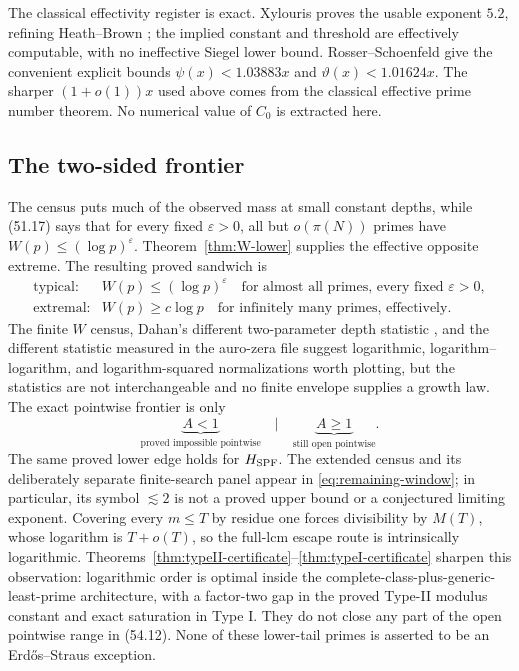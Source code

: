 \documentclass[10pt,reqno]{amsart}
\theoremstyle{definition}
\newcommand{\1}{\mathbf 1}
\newcommand{\eps}{\varepsilon}
\begin{document}
The classical effectivity register is exact.  Xylouris
\cite{Xylouris} proves the usable exponent $5.2$, refining Heath--Brown
\cite{HeathBrown}; the implied constant and threshold are effectively
computable, with no ineffective Siegel lower bound.  Rosser--Schoenfeld
\cite{RosserSchoenfeld} give the convenient explicit bounds
$\psi(x)<1.03883x$ and $\vartheta(x)<1.01624x$.  The sharper
$(1+o(1))x$ used above comes from the classical effective prime number
theorem.  No numerical value of $C_0$ is extracted here.

\subsection{The two-sided frontier}
The census puts much of the observed mass at small constant depths, while
(51.17) says that for every fixed $\eps>0$, all but $o(\pi(N))$ primes have
$W(p)\leq(\log p)^\eps$.  Theorem~\ref{thm:W-lower} supplies the effective
opposite extreme.  The resulting proved sandwich is
\begin{equation}\tag{54.11}
 \begin{array}{cl}
 \text{typical:}&W(p)\leq(\log p)^\eps
      \quad\text{for almost all primes, every fixed }\eps>0,\\
 \text{extremal:}&W(p)\geq c\log p
      \quad\text{for infinitely many primes, effectively}.
 \end{array}
\end{equation}
The finite $W$ census, Dahan's different two-parameter depth statistic
\cite{Dahan}, and the different statistic measured in the auro-zera file
suggest logarithmic, logarithm--logarithm, and logarithm-squared
normalizations worth plotting, but the statistics are not interchangeable
and no finite envelope supplies a growth law.  The exact pointwise frontier
is only
\begin{equation}\tag{54.12}
 \boxed{\quad
 \underbrace{A<1}_{\text{proved impossible pointwise}}
 \quad\big|\quad
 \underbrace{A\geq1}_{\text{still open pointwise}}.
 \quad}
\end{equation}
The same proved lower edge holds for $H_{\rm SPF}$.  The extended census and
its deliberately separate finite-search panel appear in
\eqref{eq:remaining-window}; in particular, its symbol $\lesssim2$ is not a
proved upper bound or a conjectured limiting exponent.  Covering every
$m\leq T$ by residue one forces divisibility by $M(T)$, whose logarithm is
$T+o(T)$, so the full-lcm escape route is intrinsically logarithmic.
Theorems~\ref{thm:typeII-certificate}--\ref{thm:typeI-certificate} sharpen
this observation: logarithmic order is optimal inside the
complete-class-plus-generic-least-prime architecture, with a factor-two gap
in the proved Type-II modulus constant and exact saturation in Type I.  They
do not close any part of the open pointwise range in (54.12).  None of these
lower-tail primes is asserted to be an Erd\H{o}s--Straus exception.
\end{document}
